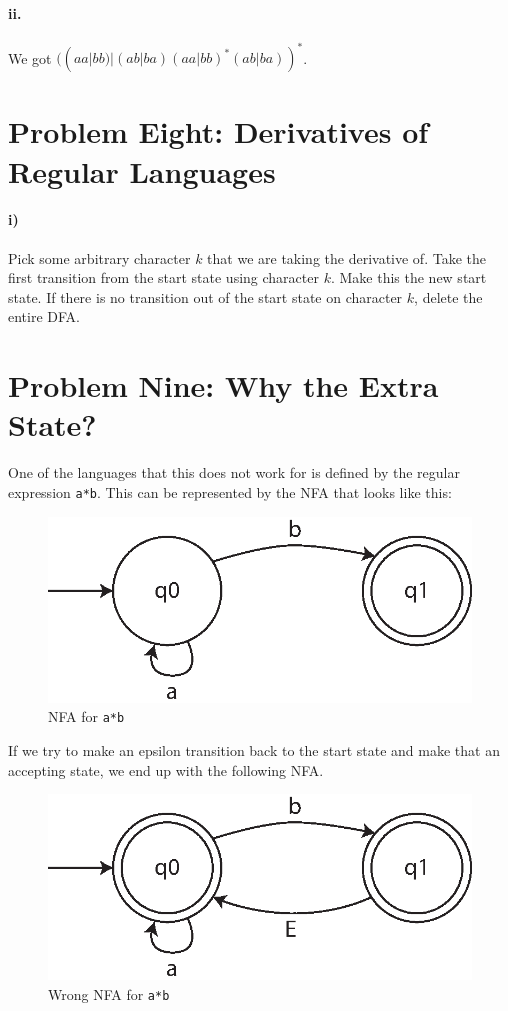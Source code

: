 \documentclass[10pt,letter]{article}
\begin{document}
\paragraph{ii.} We got $( (aa|bb) | (ab|ba) (aa|bb)^{*} (ab|ba))^{*}$.

\section*{Problem Eight: Derivatives of Regular Languages}

\paragraph{i)} Pick some arbitrary character $k$ that we are taking the derivative of. Take the first transition from the start state using character $k$. Make this the new start state. If there is no transition out of the start state on character $k$, delete the entire DFA.


\section*{Problem Nine: Why the Extra State?} 
One of the languages that this does not work for is defined by the regular expression \texttt{a*b}. This can be represented by the NFA that looks like this:

\begin{figure}[h]
\centering
  \includegraphics[width=0.45\linewidth]{9i.eps}
  \caption{NFA for \texttt{a*b}}
  \label{fig:9i}
\end{figure}

If we try to make an epsilon transition back to the start state and make that an accepting state, we end up with the following NFA.

\begin{figure}[h]
\centering
  \includegraphics[width=0.45\linewidth]{9ii.eps}
  \caption{Wrong NFA for \texttt{a*b}}
  \label{fig:9ii}
\end{figure}
\end{document}
